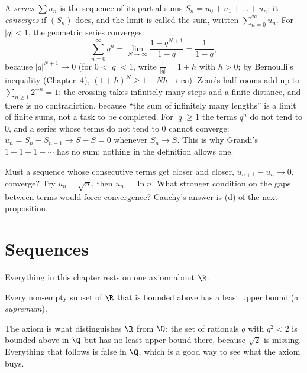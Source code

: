 \begin{examplex}
A \emph{series} $\sum u_n$ is the sequence of its partial sums $S_n=u_0+u_1+\dots+u_n$; it \emph{converges} if $(S_n)$ does, and the limit is called
the sum, written $\sum_{n=0}^\infty u_n$. For $|q|<1$, the geometric series converges:
\[
\sum_{n=0}^\infty q^n=\lim_{N\to\infty}\frac{1-q^{N+1}}{1-q}=\frac1{1-q},
\]
because $|q|^{N+1}\to0$ (for $0<|q|<1$, write $\frac1{|q|}=1+h$ with $h>0$; by Bernoulli's inequality (Chapter~4), $(1+h)^{N}\ge1+Nh\to\infty$). Zeno's half-rooms add up to $\sum_{n\ge1}2^{-n}=1$:
the crossing takes infinitely many steps and a finite distance, and there is no contradiction, because ``the sum of infinitely many lengths'' is a
limit of finite sums, not a task to be completed. For $|q|\ge1$ the terms $q^n$ do not tend to $0$, and a series whose terms do not tend to $0$ cannot
converge: $u_n=S_n-S_{n-1}\to S-S=0$ whenever $S_n\to S$. This is why Grandi's $1-1+1-\cdots$ has no sum: nothing in the definition allows one.
\end{examplex}

\begin{think}
Must a sequence whose consecutive terms get closer and closer, $u_{n+1}-u_n\to0$, converge? Try $u_n=\sqrt n$, then $u_n=\ln n$. What stronger condition on the gaps between terms would force convergence? Cauchy's answer is (d) of the next proposition.
\end{think}

\section{Sequences}

Everything in this chapter rests on one axiom about $\R$.

\begin{reminder}[completeness of $\R$]
Every non-empty subset of $\R$ that is bounded above has a least upper bound (a \emph{supremum}).
\end{reminder}

The axiom is what distinguishes $\R$ from $\Q$: the set of rationals $q$ with $q^2<2$ is bounded above in $\Q$ but has no least upper bound there, because
$\sqrt2$ is missing. Everything that follows is false in $\Q$, which is a good way to see what the axiom buys.

